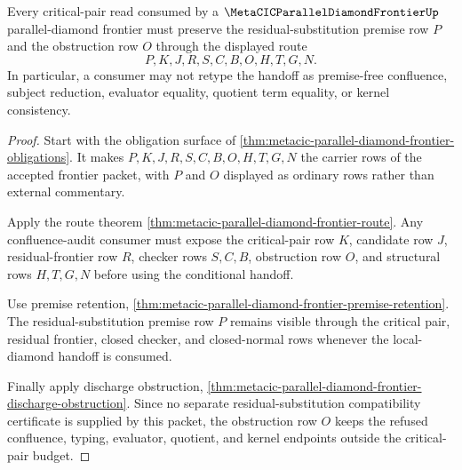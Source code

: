 \begin{theorem}
\label{thm:metacic-parallel-diamond-frontier-critical-pair-obstruction-budget}
Every critical-pair read consumed by a $\MetaCICParallelDiamondFrontierUp$
parallel-diamond frontier must preserve the residual-substitution premise row
$P$ and the obstruction row $O$ through the displayed route
$$
P,K,J,R,S,C,B,O,H,T,G,N .
$$
In particular, a consumer may not retype the handoff as premise-free
confluence, subject reduction, evaluator equality, quotient term equality, or
kernel consistency.
\end{theorem}
\begin{proof}
Start with the obligation surface of
\autoref{thm:metacic-parallel-diamond-frontier-obligations}. It makes
$P,K,J,R,S,C,B,O,H,T,G,N$ the carrier rows of the accepted frontier packet,
with $P$ and $O$ displayed as ordinary rows rather than external commentary.

Apply the route theorem
\autoref{thm:metacic-parallel-diamond-frontier-route}. Any confluence-audit
consumer must expose the critical-pair row $K$, candidate row $J$,
residual-frontier row $R$, checker rows $S,C,B$, obstruction row $O$, and
structural rows $H,T,G,N$ before using the conditional handoff.

Use premise retention,
\autoref{thm:metacic-parallel-diamond-frontier-premise-retention}. The
residual-substitution premise row $P$ remains visible through the critical
pair, residual frontier, closed checker, and closed-normal rows whenever the
local-diamond handoff is consumed.

Finally apply discharge obstruction,
\autoref{thm:metacic-parallel-diamond-frontier-discharge-obstruction}. Since
no separate residual-substitution compatibility certificate is supplied by
this packet, the obstruction row $O$ keeps the refused confluence, typing,
evaluator, quotient, and kernel endpoints outside the critical-pair budget.
\end{proof}

